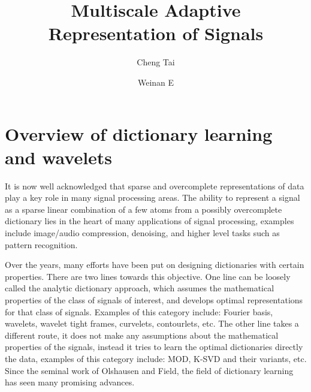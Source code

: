 \documentclass[a4paper]{article}
\title{Multiscale Adaptive Representation of Signals}
\author[1]{Cheng Tai}
\author[2]{Weinan E}
\affil[1]{PACM, Princeton University}
\affil[2]{Department of Mathematics and PACM, Princeton University}
\begin{document}
\newtheorem{lem}{Lemma}
\newtheorem{prop}{Proposition}
\newtheorem{rem}{Remark}
\newtheorem{thm}{Theorem}
\renewcommand{\a}{\mathbf{a}}
\renewcommand{\v}{\mathbf{v}}

\date{}
\maketitle
{}

\section{Overview of dictionary learning and wavelets}
It is now well acknowledged that sparse and overcomplete representations of data play a key role in many signal processing areas. The ability to represent a signal as a sparse linear combination of a few atoms from a possibly overcomplete dictionary lies in the heart of many applications of signal processing, examples include image/audio compression, denoising, and higher level tasks such as pattern recognition.

Over the years, many efforts have been put on designing dictionaries with certain properties. There are two lines towards this objective.  One line can be loosely called the analytic dictionary approach, which assumes the mathematical properties of the class of signals of interest, and develops optimal representations for that class of signals. Examples of this category include: Fourier basis, wavelets, wavelet tight frames\cite{daubechies2003framelets}, curvelets\cite{candes2000curvelets}, contourlets\cite{do2002contourlets}, etc. The other line takes a different route, it does not make any assumptions about the mathematical properties of the signals, instead it tries to learn the optimal dictionaries directly the data, examples of this category include: MOD\cite{engan1999method}, K-SVD\cite{aharon2006svd} and their variants, etc. Since the seminal work of Olshausen and Field\cite{olshausen1996emergence}, the field of dictionary learning has seen many promising advances. 
\end{document}
